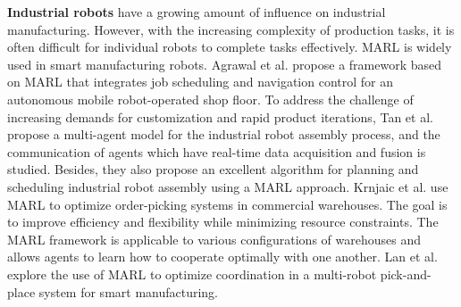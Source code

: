 \documentclass[acmsmall]{acmart}
\begin{document}
\textbf{Industrial robots} have a growing amount of influence on industrial manufacturing. However, with the increasing complexity of production tasks, it is often difficult for individual robots to complete tasks effectively. MARL is widely used in smart manufacturing robots. 
Agrawal et al. \cite{agrawal_won_sharma_deshpande_mccomb_2021} propose a framework based on MARL that integrates job scheduling and navigation control for an autonomous mobile robot-operated shop floor. 
To address the challenge of increasing demands for customization and rapid product iterations, Tan et al. \cite{Tan2019} propose a multi-agent model for the industrial robot assembly process, and the communication of agents which have real-time data acquisition and fusion is studied. Besides, they also propose an excellent algorithm for planning and scheduling industrial robot assembly using a MARL approach. 
Krnjaic et al. \cite{krnjaic2022scalable} use MARL to optimize order-picking systems in commercial warehouses. The goal is to improve efficiency and flexibility while minimizing resource constraints. The MARL framework is applicable to various configurations of warehouses and allows agents to learn how to cooperate optimally with one another. %
Lan et al. \cite{9376433} explore the use of MARL to optimize coordination in a multi-robot pick-and-place system for smart manufacturing. 
\end{document}

